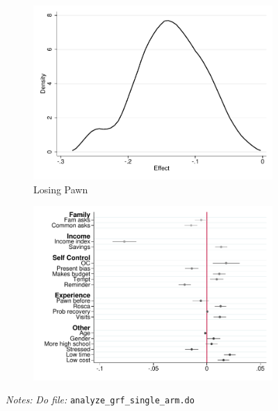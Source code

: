\documentclass[11pt]{article}
\begin{document}
\begin{figure}[H]
\begin{center}
\begin{subfigure}{0.4\textwidth}
    \end{subfigure}
    
    \begin{subfigure}{0.4\textwidth}
        \caption{Losing Pawn}
        \centering
        \includegraphics[width=\textwidth]{Figuras/he_dist_def_c_pro_2.pdf}
    \end{subfigure}
    \begin{subfigure}{0.4\textwidth}
        \caption*{}
        \centering
        \includegraphics[width=\textwidth]{Figuras/HE/he_int_vertical_def_c_pro_2.pdf}
    \end{subfigure}
    \end{center}
     \footnotesize \textit{Notes: } 
      \footnotesize{ \textit{Do file: }  \texttt{analyze\_grf\_single\_arm.do}}
\end{figure}
\end{document}
